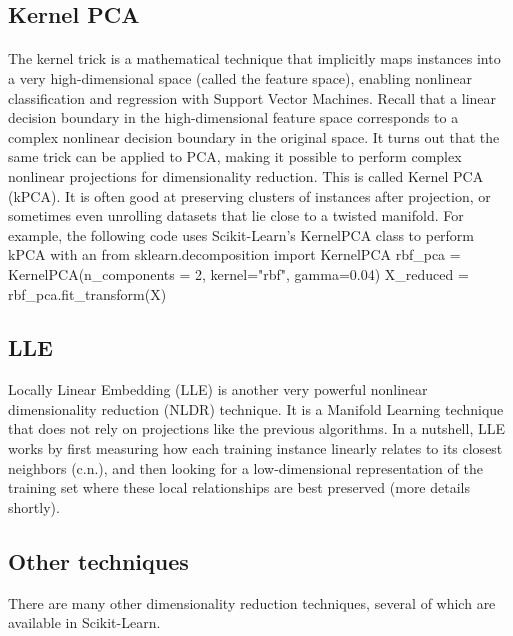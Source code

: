\documentclass[%
oneside,                 %
final,                   %
10pt]{article}
\begin{document}
\subsection{Kernel PCA}

\paragraph{}

The kernel trick is a mathematical technique that implicitly maps instances into a
very high-dimensional space (called the feature space), enabling nonlinear classification and regression
with Support Vector Machines. Recall that a linear decision boundary in the high-dimensional feature
space corresponds to a complex nonlinear decision boundary in the original space.
It turns out that the same trick can be applied to PCA, making it possible to perform complex nonlinear
projections for dimensionality reduction. This is called Kernel PCA (kPCA). It is often good at
preserving clusters of instances after projection, or sometimes even unrolling datasets that lie close to a
twisted manifold.
For example, the following code uses Scikit-Learn’s KernelPCA class to perform kPCA with an
\bpycod
from sklearn.decomposition import KernelPCA
rbf_pca = KernelPCA(n_components = 2, kernel="rbf", gamma=0.04)
X_reduced = rbf_pca.fit_transform(X)
\epycod

 


\subsection{LLE}

Locally Linear Embedding (LLE) is another very powerful nonlinear dimensionality reduction
(NLDR) technique. It is a Manifold Learning technique that does not rely on projections like the previous
algorithms. In a nutshell, LLE works by first measuring how each training instance linearly relates to its
closest neighbors (c.n.), and then looking for a low-dimensional representation of the training set where
these local relationships are best preserved (more details shortly). 



\subsection{Other techniques}


There are many other dimensionality reduction techniques, several of which are available in Scikit-Learn.
\end{document}
